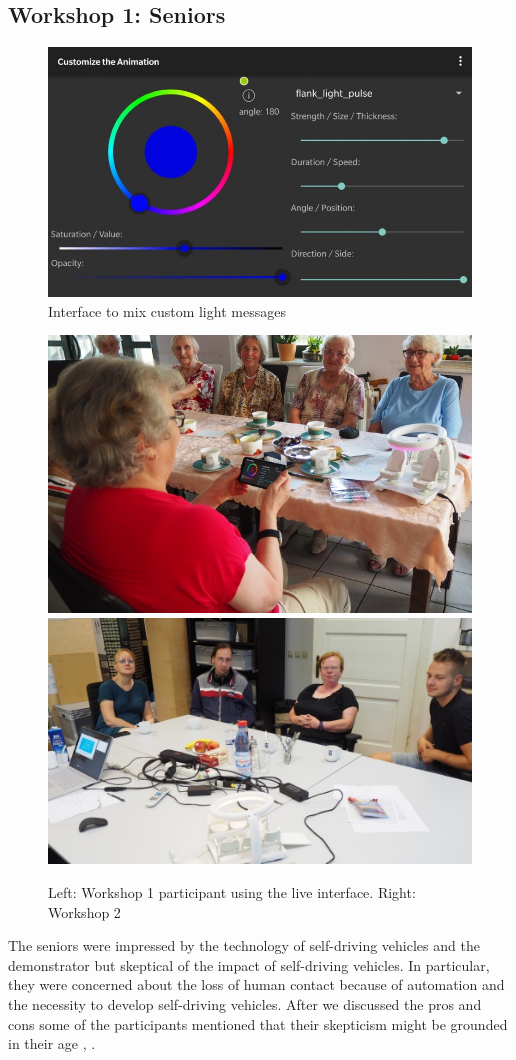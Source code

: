 \subsection{Workshop 1: Seniors}
\begin{figure}
    \includegraphics[height=0.45\textwidth]{fig/customAniShrunk.jpg}
    \caption[Light mixing interface]{Interface to mix custom light messages}
    \label{fig:liveinterface}
\end{figure}
\begin{figure}
    \includegraphics[height=0.3\textwidth]{fig/omis.jpg}\hfill\includegraphics[height=0.3\textwidth]{fig/workshop2.JPG}
    \caption[Workshop]{Left: Workshop 1 participant using the live interface. Right: Workshop 2}
    \label{fig:workshop}
\end{figure}
The seniors were impressed by the technology of self-driving vehicles and the demonstrator but skeptical of the impact of self-driving vehicles. In particular, they were concerned about the loss of human contact because of automation and the necessity to develop self-driving vehicles. After we discussed the pros and cons some of the participants mentioned that their skepticism might be grounded in their age , . 
